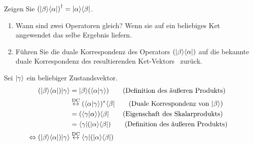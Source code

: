 \begin{aufg}
 Zeigen Sie $\herm{(\ketb\braa)} = \keta\brab$.
\end{aufg}
\begin{tipp}
 \begin{enumerate}
  \item Wann sind zwei Operatoren gleich? Wenn sie auf ein beliebiges Ket angewendet das selbe Ergebnis liefern.
  \item F\"uhren Sie die duale Korrespondenz des Operators $(\ketb\braa)$ auf die bekannte duale Korrespondenz des resultierenden Ket-Vektors \ketb\ zur\"uck.
 \end{enumerate}
\end{tipp}
\begin{loes}
 Sei $\ket{\gamma}$ ein beliebiger Zustandsvektor.
 \begin{align}
 (\ketb\braa) \ket{\gamma} &= \ketb (\braket{\alpha | \gamma}) \tag{Definition des \"au\ss{}eren Produkts} \\
 &\dc \cc{(\braket{\alpha | \gamma})} \brab \tag{Duale Korrespondenz von \ketb} \\
 &= (\braket{\gamma | \alpha}) \brab \tag{Eigenschaft des Skalarprodukts} \\
 &= \bra{\gamma} (\keta\brab) \tag{Definition des \"au\ss{}eren Produkts} \\
 \Leftrightarrow  (\ketb\braa) \ket{\gamma} &\dc \bra{\gamma} (\keta\brab)
 \end{align}
\qedsymbol
\end{loes}

